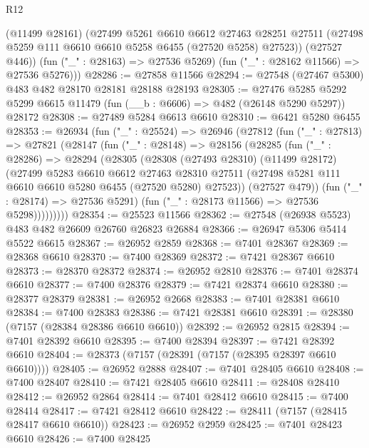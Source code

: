 \begin{lexlean}{R12}
\begin{coremodule}
          (@11499 @28161)
          (@27499
            @5261
            @6610
            @6612
            @27463
            @28251
            @27511
            (@27498 @5259 @111 @6610 @6610 @5258 @6455 (@27520 @5258) @27523))
          (@27527 @446))
        (fun ("_" : @28163) => @27536 @5269)
        (fun ("_" : @28162 @11566) => @27536 @5276)))
@28286 := @27858 @11566
@28294 := @27548 (@27467 @5300) @483 @482 @28170 @28181 @28188 @28193
@28305 := @27476
    @5285
    @5292
    @5299
    @6615
    @11479
    (fun (__b : @6606) => @482 (@26148 @5290 @5297))
    @28172
@28308 := @27489 @5284 @6613 @6610
@28310 := @6421 @5280 @6455
@28353 := @26934
    (fun ("_" : @25524) =>
    @26946
      (@27812
        (fun ("_" : @27813) =>
        @27821
          (@28147
            (fun ("_" : @28148) =>
            @28156
              (@28285
                (fun ("_" : @28286) =>
                @28294
                  (@28305
                    (@28308
                      (@27493 @28310)
                      (@11499 @28172)
                      (@27499
                        @5283
                        @6610
                        @6612
                        @27463
                        @28310
                        @27511
                        (@27498 @5281 @111 @6610 @6610 @5280 @6455 (@27520 @5280) @27523))
                      (@27527 @479))
                    (fun ("_" : @28174) => @27536 @5291)
                    (fun ("_" : @28173 @11566) => @27536 @5298)))))))))
@28354 := @25523 @11566
@28362 := @27548 (@26938 @5523) @483 @482 @26609 @26760 @26823 @26884
@28366 := @26947 @5306 @5414 @5522 @6615
@28367 := @26952 @2859
@28368 := @7401 @28367
@28369 := @28368 @6610
@28370 := @7400 @28369
@28372 := @7421 @28367 @6610
@28373 := @28370 @28372
@28374 := @26952 @2810
@28376 := @7401 @28374 @6610
@28377 := @7400 @28376
@28379 := @7421 @28374 @6610
@28380 := @28377 @28379
@28381 := @26952 @2668
@28383 := @7401 @28381 @6610
@28384 := @7400 @28383
@28386 := @7421 @28381 @6610
@28391 := @28380 (@7157 (@28384 @28386 @6610 @6610))
@28392 := @26952 @2815
@28394 := @7401 @28392 @6610
@28395 := @7400 @28394
@28397 := @7421 @28392 @6610
@28404 := @28373 (@7157 (@28391 (@7157 (@28395 @28397 @6610 @6610))))
@28405 := @26952 @2888
@28407 := @7401 @28405 @6610
@28408 := @7400 @28407
@28410 := @7421 @28405 @6610
@28411 := @28408 @28410
@28412 := @26952 @2864
@28414 := @7401 @28412 @6610
@28415 := @7400 @28414
@28417 := @7421 @28412 @6610
@28422 := @28411 (@7157 (@28415 @28417 @6610 @6610))
@28423 := @26952 @2959
@28425 := @7401 @28423 @6610
@28426 := @7400 @28425

\end{coremodule}
\end{lexlean}
